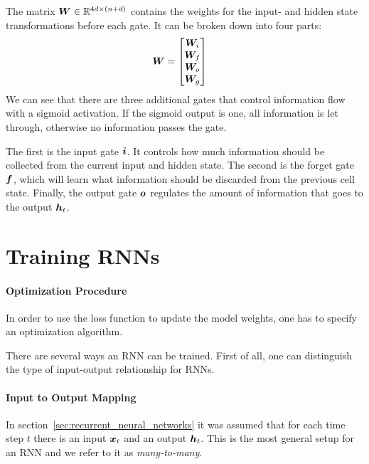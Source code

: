 		The matrix $\bm{W} \in \mathbb{R}^{4d \times (n + d)}$ contains the weights for the input- and hidden state transformations before each gate.
		It can be broken down into four parts:
		\begin{align}
			\bm{W} &=
			\begin{bmatrix}
				\bm{W}_i \\ 
				\bm{W}_f \\ 
				\bm{W}_o \\ 
				\bm{W}_g
			\end{bmatrix}
		\end{align}
		We can see that there are three additional gates that control information flow with a sigmoid activation.
		If the sigmoid output is one, all information is let through, otherwise no information passes the gate. 
		
		The first is the input gate $\bm{i}$.
		It controls how much information should be collected from the current input and hidden state.
		The second is the forget gate $\bm{f}$, which will learn what information should be discarded from the previous cell state.
		Finally, the output gate $\bm{o}$ regulates the amount of information that goes to the output $\bm{h}_t$.
		
	\section{Training RNNs}
		
		\paragraph{Optimization Procedure}
		In order to use the loss function to update the model weights, one has to specify an optimization algorithm.

		
		There are several ways an RNN can be trained.
		First of all, one can distinguish the type of input-output relationship for RNNs.
		
		\paragraph{Input to Output Mapping}
		In section~\ref{sec:recurrent_neural_networks} it was assumed that for each time step $t$ there is an input $\bm{x}_t$ and an output $\bm{h}_t$.
		This is the most general setup for an RNN and we refer to it as \emph{many-to-many}. 
		

